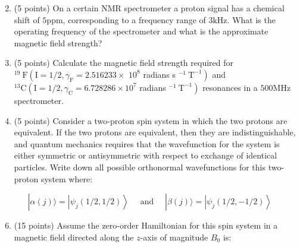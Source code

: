 \documentclass[12pt]{article}
\begin{document}
\begin{enumerate}
  \setcounter{enumi}{1}

  \item (5 points) On a certain NMR spectrometer a proton signal has a chemical shift of $5 \mathrm{ppm}$, corresponding to a frequency range of $3 \mathrm{kHz}$. What is the operating frequency of the spectrometer and what is the approximate magnetic field strength?

  \item (5 points) Calculate the magnetic field strength required for ${ }^{19} \mathrm{~F}\left(\mathrm{I}=1 / 2, \gamma_{\mathrm{F}}=2.516233 \times\right.$ $10^{8}$ radians s $\left.^{-1} \mathrm{~T}^{-1}\right)$ and ${ }^{13} \mathrm{C}\left(\mathrm{I}=1 / 2, \gamma_{\mathrm{C}}=6.728286 \times 10^{7}\right.$ radians $\left.^{-1} \mathrm{~T}^{-1}\right)$ resonances in a $500 \mathrm{MHz}$ spectrometer.

  \item (5 points) Consider a two-proton spin system in which the two protons are equivalent. If the two protons are equivalent, then they are indistinguishable, and quantum mechanics requires that the wavefunction for the system is either symmetric or antisymmetric with respect to exchange of identical particles. Write down all possible orthonormal wavefunctions for this two-proton system where:

\end{enumerate}

$$
|\alpha(j)\rangle=\left|\psi_{j}(1 / 2,1 / 2)\right\rangle \quad \text { and } \quad|\beta(j)\rangle=\left|\psi_{j}(1 / 2,-1 / 2)\right\rangle
$$

\begin{enumerate}
  \setcounter{enumi}{5}
  \item (15 points) Assume the zero-order Hamiltonian for this spin system in a magnetic field directed along the $z$-axis of magnitude $B_{0}$ is:
\end{enumerate}
\end{document}
